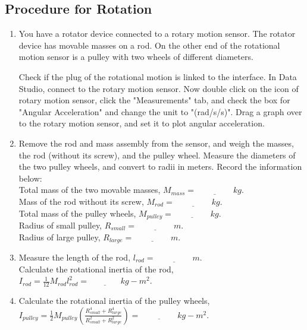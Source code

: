 \documentclass{article}
\begin{document}
\subsection*{Procedure for Rotation}
\begin{enumerate}

\item You have a rotator device connected to a rotary motion sensor. The rotator device has movable masses on a rod. On the other end of the rotational motion sensor is a pulley with two wheels of different diameters. 

Check if the plug of the rotational motion is linked to the interface. %
In Data Studio, connect to the rotary motion sensor. Now double click on the icon of rotary motion sensor, click the "Measurements" tab, and check the box for "Angular Acceleration" and change the unit to "(rad/s/s)". Drag a graph over to the rotary motion sensor, and set it to plot angular acceleration. 



\item Remove the rod and mass assembly from the sensor, and weigh the masses, the rod (without its screw), and the pulley wheel. Measure the diameters of the two pulley wheels, and convert to radii in meters. Record the information below: \\
Total mass of the two movable masses, $M_{mass}=\underline{~~~~~~~~~~~~~~~~~~~~}kg$.\\
Mass of the rod without its screw, $M_{rod}=\underline{~~~~~~~~~~~~~~~~~~~~}kg$.\\
Total mass of the pulley wheels, $M_{pulley}=\underline{~~~~~~~~~~~~~~~~~~~~}kg$.\\ 
Radius of small pulley, $R_{small}=\underline{~~~~~~~~~~~~~~~~~~~~}m$.\\ 
Radius of large pulley, $R_{large}=\underline{~~~~~~~~~~~~~~~~~~~~}m$.\\ 

\item Measure the length of the rod, $l_{rod}=\underline{~~~~~~~~~~~~~~~~~~~~}m$.\\
Calculate the rotational inertia of the rod, $I_{rod}=\frac{1}{12}M_{rod}l_{rod}^2=\underline{~~~~~~~~~~~~~~~~~}kg-m^2$.

\item Calculate the rotational inertia of the pulley wheels, $I_{pulley}=\frac{1}{2}M_{pulley}(\frac{R_{small}^4+R_{large}^4}{R_{small}^2+R_{large}^2})=\underline{~~~~~~~~~~~~~~~~~~~~}kg-m^2$.


\end{enumerate}
\end{document}
